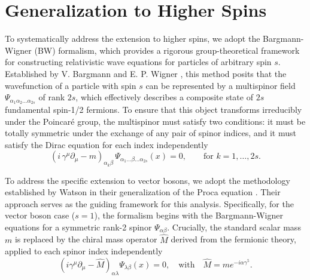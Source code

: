 \section{Generalization to Higher Spins}
\label{sec:HigherSpins}

To systematically address the extension to higher spins, we adopt the
Bargmann-Wigner (BW) formalism, which provides a rigorous group-theoretical
framework for constructing relativistic wave equations for particles of
arbitrary spin $s$. Established by V. Bargmann and E. P. Wigner
\cite{bargmannGroupTheoreticalDiscussion1997}, this method posits that the wavefunction of a particle
with spin $s$ can be represented by a multispinor field $\Psi_{\alpha_1 \alpha_2
\dots \alpha_{2s}}$ of rank $2s$, which effectively describes a composite state
of $2s$ fundamental spin-1/2 fermions. To ensure that this object transforms
irreducibly under the Poincar\'{e} group, the multispinor must satisfy two
conditions: it must be totally symmetric under the exchange of any pair of
spinor indices, and it must satisfy the Dirac equation for each index
independently
\begin{equation}
  \left( i\,\gamma^\mu \partial_\mu - m \right)_{\alpha_k \beta}\,
  \Psi_{\alpha_1 \dots \beta \dots \alpha_{2s}}(x)
  = 0,
  \qquad \text{for } k = 1, \dots, 2s .
\end{equation}

To address the specific extension to vector bosons, we adopt the methodology
established by Watson in their generalization of the Proca equation
\cite{Watson2022}. Their approach serves as the guiding framework for this
analysis. Specifically, for the vector boson case ($s=1$), the formalism begins
with the Bargmann-Wigner equations for a symmetric rank-2 spinor
$\Psi_{\alpha\beta}$. Crucially, the standard scalar mass $m$ is replaced by the
chiral mass operator $\hat{M}$ derived from the fermionic theory, applied to
each spinor index independently
\begin{equation}
  \left(i \gamma^\mu \partial_\mu - \hat{M}\right)_{\alpha \lambda}
  \Psi_{\lambda \beta}(x) = 0, \quad \text{with} \quad \hat{M} = m
  e^{-i\alpha\gamma^5}.
\end{equation}


